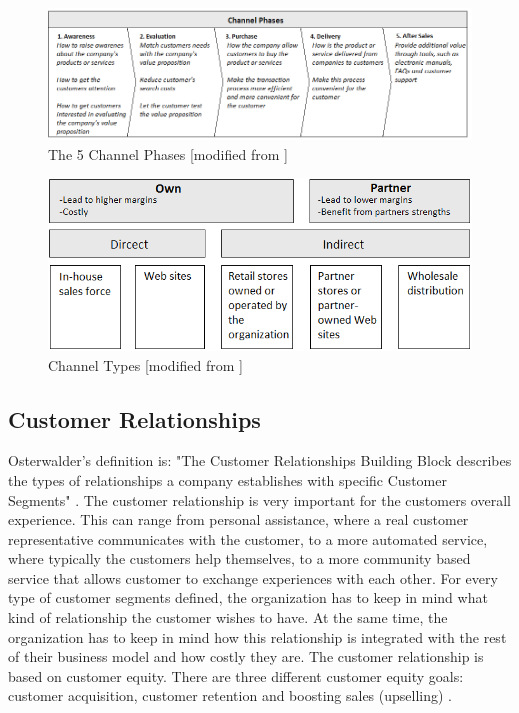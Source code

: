 \begin{figure}
\begin{center}
\includegraphics[angle=90,scale=0.6]{kjopskjede}
\caption[Channel Phases]{The 5 Channel Phases [modified from \cite{osterwalder}\cite{osterwalderthesis}]}
\label{fig:ChannelPhases}
\end{center}
\end{figure} 

\begin{figure}
\begin{center}
\includegraphics[scale=0.7]{channeltypes}
\caption[Channel Types]{Channel Types [modified from \cite{osterwalder}]}
\label{fig:ChannelTypes}
\end{center}
\end{figure} 

\newpage
\subsection{Customer Relationships}
Osterwalder's definition is: "The Customer Relationships Building Block describes the types of relationships a company establishes with specific Customer Segments" \cite{osterwalder}. The customer relationship is very important for the customers overall experience. This can range from personal assistance, where a real customer representative communicates with the customer, to a more automated service, where typically the customers help themselves,  to a more community based service that allows customer to exchange experiences with each other. For every type of customer segments defined, the organization has to keep in mind what kind of relationship the customer wishes to have. At the same time, the organization has to keep in mind how this relationship is integrated with the rest of their business model and how costly they are. The customer relationship is based on customer equity. There are three different customer equity goals: customer acquisition, customer retention and boosting sales (upselling) \cite{osterwalderthesis}.

